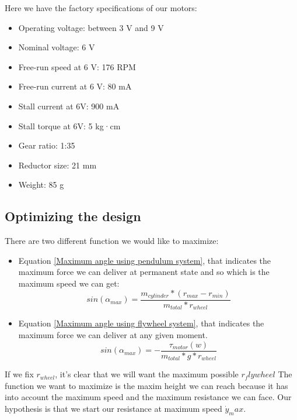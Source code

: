 Here we have the factory specifications of our motors: 
\begin{itemize}
    \item Operating voltage: between 3 V and 9 V
    \item Nominal voltage: 6 V
    \item Free-run speed at 6 V: 176 RPM
    \item Free-run current at 6 V: 80 mA
    \item Stall current at 6V: 900 mA
    \item Stall torque at 6V: 5 kg·cm
    \item Gear ratio: 1:35
    \item Reductor size: 21 mm
    \item Weight: 85 g
\end{itemize}

\subsection{Optimizing the design}
There are two different function we would like to maximize:
\begin{itemize}
    \item Equation \ref{Maximum angle using pendulum system}, that indicates the maximum force we can deliver at permanent state and so which is the maximum speed we can get:
     \[sin(\alpha_{max}) = \frac{m_{cylinder} * (r_{max}- r_{min})}{m_{total} * r_{wheel}}\]
     \item Equation \ref{Maximum angle using flywheel system}, that indicates the maximum force we can deliver at any given moment.
     \[sin(\alpha_{max}) = - \frac{\tau_{motor} (w)}{m_{total} * g * r_{wheel}} \]
\end{itemize}

If we fix $r_{wheel}$, it's clear that we will want the maximum possible $r_flywheel$ 
\iffalse
The function we want to maximize is the maxim height we can reach because it has into account the maximum speed and the maximum resistance we can face.
Our hypothesis is that we start our resistance at maximum speed $\dot{y}_max$.


